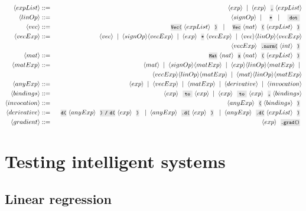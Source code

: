 \begin{eqnarray*}
\bnfrl{expList} & ::= & \bnfrl{exp} \mor \bnfrl{exp} \code{,} \bnfrl{expList} \\
\bnfrl{linOp} & ::= & \bnfrl{signOp} \mor \code{*} \mor \code{ dot } \\
\bnfrl{vec} & ::= & \code{Vec(} \bnfrl{expList} \code{)} \mor \code{Vec} \bnfrl{nat} \code{(} \bnfrl{expList} \code{)} \\
\bnfrl{vecExp} & ::= & \bnfrl{vec} \mor \bnfrl{signOp}\bnfrl{vecExp} \mor \bnfrl{exp} \code{*} \bnfrl{vecExp} \mor \bnfrl{vec} \bnfrl{linOp} \bnfrl{vecExp} \\
&&\bnfrl{vecExp}\code{.norm(}\bnfrl{int}\code{)} \\
\bnfrl{mat} & ::= & \code{Mat} \bnfrl{nat} \code{x} \bnfrl{nat} \code{(} \bnfrl{expList} \code{)} \\
\bnfrl{matExp} & ::= & \bnfrl{mat} \mor \bnfrl{signOp}\bnfrl{matExp} \mor \bnfrl{exp}\bnfrl{linOp}\bnfrl{matExp} \mor \\
&&\bnfrl{vecExp}\bnfrl{linOp}\bnfrl{matExp} \mor \bnfrl{mat} \bnfrl{linOp} \bnfrl{matExp} \\
\bnfrl{anyExp} & ::= & \bnfrl{exp} \mor \bnfrl{vecExp} \mor \bnfrl{matExp} \mor \bnfrl{derivative} \mor \bnfrl{invocation} \\
\bnfrl{bindings} & ::= & \bnfrl{exp} \code{ to } \bnfrl{exp} \mor \bnfrl{exp} \code{ to } \bnfrl{exp} \code{,} \bnfrl{bindings} \\
\bnfrl{invocation} & ::= & \bnfrl{anyExp} \code{(} \bnfrl{bindings} \code{)} \\
\bnfrl{derivative} & ::= & \code{d(} \bnfrl{anyExp} \code{) / d(} \bnfrl{exp} \code{)} \mor \bnfrl{anyExp} \code{.d(} \bnfrl{exp} \code{)} \mor \bnfrl{anyExp} \code{.d(} \bnfrl{expList} \code{)} \\
\bnfrl{gradient} & ::= & \bnfrl{exp} \code{.grad()}
\end{eqnarray*}

\chapter{Testing intelligent systems}

\section{Linear regression}\label{sec:lin_reg}

